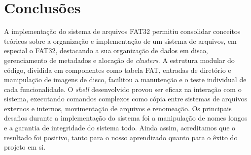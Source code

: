 \documentclass[
    12pt,				%
    oneside,   	        %
    a4paper,			%
    english,			%
    french,				%
    spanish,			%
    brazil,				%
    ]{pacotes/abntex2}
\begin{document}

\section{Conclusões}
\label{sec:conclusoes}
A implementação do sistema de arquivos FAT32 permitiu consolidar conceitos teóricos sobre a organização e implementação de um sistema de arquivos, em especial o FAT32, destacando a sua organização de dados em disco, gerenciamento de metadados e alocação de \textit{clusters}. A estrutura modular do código, dividida em componentes como tabela FAT, entradas de diretório e manipulação de imagens de disco, facilitou a manutenção e o teste individual de cada funcionalidade. O \textit{shell} desenvolvido provou ser eficaz na interação com o sistema, executando comandos complexos como cópia entre sistemas de arquivos externos e internos, movimentação de arquivos e renomeação. Os principais desafios durante a implementação do sistema foi a manipulação de nomes longos e a garantia de integridade do sistema todo. Ainda assim, acreditamos que o resultado foi positivo, tanto para o nosso aprendizado quanto para o êxito do projeto em si.

\postextual
\renewcommand{\bibsection}{%
\section{\bibname}
\bibmark
\prebibhook}


\end{document}
